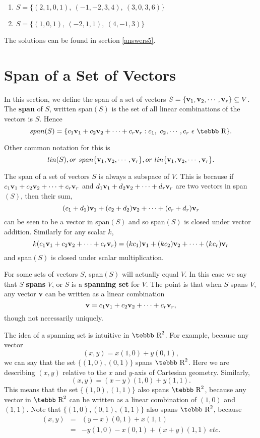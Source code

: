 \begin{enumerate}
\item $S=\{ (2,1,0,1), \ (-1,-2,3,4), \ (3,0,3,6) \}$
\item $S=\{ (1,0,1), \ (-2,1,1), \ (4,-1,3) \}$
\end{enumerate}

The solutions can be found in section \ref{answers5}.

\section{Span of a Set of Vectors} \label{ssec.span} 

In this section, we define the span of a set of vectors $S=\{{\bf
v}_1,{\bf v}_2, \cdots, {\bf v}_r\}\subseteq V$. The {\bf span} of
$S$, written span$(S)$ is the set of all linear combinations of
the vectors is $S$. Hence
$$span(S)=\{ c_1{\bf v}_1+c_2{\bf v}_2+ \cdots+ c_r{\bf v}_r :
c_1,~c_2,\cdots, c_r~\epsilon~\mbox{\tebbb R} \}.$$

\noindent Other common notation for this is $$lin(S), or~
span\{{\bf v}_1,{\bf v}_2, \cdots, {\bf v}_r\}, or~lin\{{\bf
v}_1,{\bf v}_2, \cdots, {\bf v}_r\}.$$

The span of a set of vectors $S$ is always a subspace of $V$. This
is because if $c_1{\bf v}_1+c_2{\bf v}_2+ \cdots+ c_r{\bf v}_r$
and $d_1{\bf v}_1+d_2{\bf v}_2+ \cdots+ d_r{\bf v}_r$ are two
vectors in span$(S)$, then their sum,
$$ (c_1+d_1){\bf v}_1+(c_2+d_2){\bf v}_2+ \cdots+ (c_r+d_r){\bf v}_r$$
can be seen to be a vector in span$(S)$ and so span$(S)$ is closed
under vector addition. Similarly for any scalar $k$,$$k(c_1{\bf
v}_1+c_2{\bf v}_2+ \cdots+ c_r{\bf v}_r)=(kc_1){\bf v}_1+(kc_2)
{\bf v}_2+ \cdots+ (kc_r){\bf v}_r$$ and span$(S)$ is closed under
scalar multiplication.

For some sets of vectors $S$, span$(S)$ will actually equal ${
V}$. In this case we say that $S$ {\bf spans} $V$, or $S$ is a
{\bf spanning set} for $V$. The point is that when $S$ spans $V$,
{any} vector {\bf v} can be written as a linear combination
$${\bf v}=c_1{\bf v}_1+c_2{\bf v}_2+ \cdots + c_r{\bf v}_r,$$
though not necessarily uniquely.

The idea of a spanning set is intuitive in $\mbox{\tebbb R}^2$.
For example, because any vector $$(x,y)=x(1,0)+y(0,1),$$ we can
say that the set $\{(1,0),(0,1)\}$ spans $\mbox{\tebbb R}^2$. Here
we are describing $(x,y)$ relative to the $x$ and $y$-axis of
Cartesian geometry. Similarly, $$(x,y)=(x-y)(1,0)+y(1,1).$$ This
means that the set $\{(1,0),(1,1)\}$ also spans $\mbox{\tebbb
R}^2$, because any vector in $\mbox{\tebbb R}^2$ can be written as
a linear combination of $(1,0)$ and $(1,1)$. Note that
$\{(1,0),(0,1),(1,1)\}$ also spans $\mbox{\tebbb R}^2$, because
\begin{eqnarray*}
(x,y)&=&(y-x)(0,1)+x(1,1) \\ &=&-y(1,0)-x(0,1)+(x+y)(1,1)~etc.
\end{eqnarray*}

